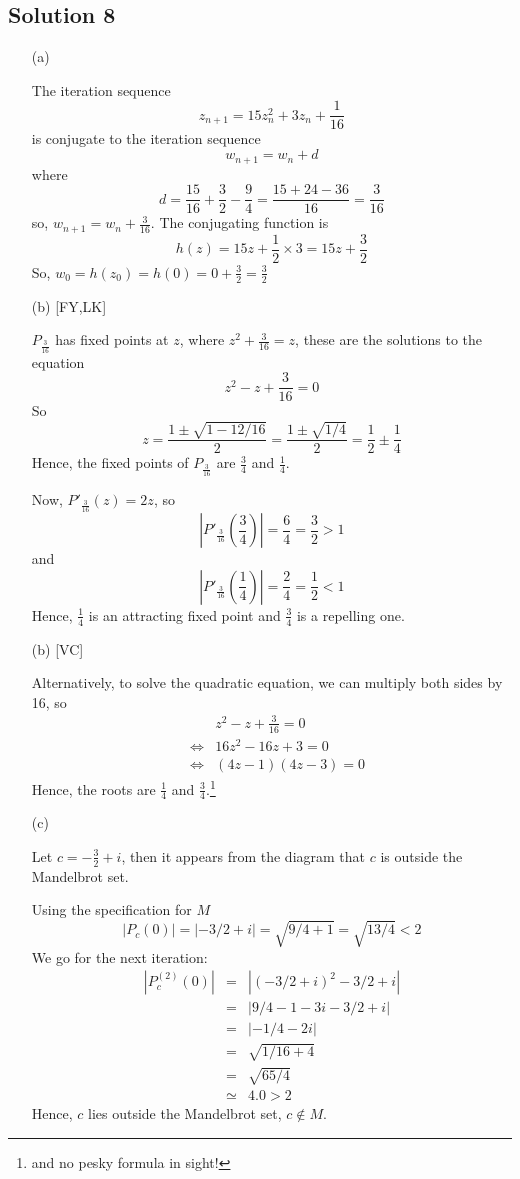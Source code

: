 \subsection*{Solution 8}

\begin{itemize}
\item[(a)]

The iteration sequence
\[
z_{n+1} = 15z_n^2 + 3z_n + \frac{1}{16}
\]
is conjugate to the iteration sequence
\[
w_{n+1} = w_n+d
\]
where
\[
d = \frac{15}{16} + \frac{3}{2} - \frac{9}{4} = \frac{15+24-36}{16} = \frac{3}{16}
\]
so, $w_{n+1} = w_n+\frac{3}{16}$.
The conjugating function is
\[
h(z) = 15z+\frac{1}{2}\times3 = 15z+\frac{3}{2}
\]
So, $w_0 = h(z_0) = h(0) = 0+\frac{3}{2} = \frac{3}{2}$

\item[(b)][FY,LK]

$P_{\frac{3}{16}}$ has fixed points at $z$, where $z^2+\frac{3}{16}=z$,
these are the solutions to the equation
\[
z^2-z+\frac{3}{16} = 0
\]
So
\[
z = \frac{ 1 \pm \sqrt{1 - 12/16} }{ 2 } = \frac{ 1 \pm \sqrt{1/4} }{ 2 } = \frac{1}{2}\pm\frac{1}{4}
\]
Hence, the fixed points of $P_{\frac{3}{16}}$ are $\frac{3}{4}$ and $\frac{1}{4}$.

Now, $P'_{\frac{3}{16}}(z) = 2z$, so
\[ \left|P'_{\frac{3}{16}}\left(\frac{3}{4}\right)\right| = \frac{6}{4} = \frac{3}{2} > 1 \]
and
\[ \left|P'_{\frac{3}{16}}\left(\frac{1}{4}\right)\right| = \frac{2}{4} = \frac{1}{2} < 1 \]
Hence, $\frac{1}{4}$ is an attracting fixed point and $\frac{3}{4}$
is a repelling one.

\item[(b)][VC]

Alternatively, to solve the quadratic equation, we can multiply both
sides by 16, so
\begin{eqnarray*}
&&
	z^2 - z + \frac{3}{16} = 0 \\
&\Leftrightarrow&
	16z^2 - 16z + 3 = 0 \\
&\Leftrightarrow&
	(4z - 1)(4z - 3) = 0
\end{eqnarray*}
Hence, the roots are $\frac{1}{4}$ and $\frac{3}{4}$.\footnote{and no
pesky formula in sight!}

\item[(c)]

Let $c=-\frac{3}{2}+i$, then it appears from the diagram that $c$ is
outside the Mandelbrot set.

Using the specification for $M$
\[
|P_c(0)| = |-3/2+i| = \sqrt{9/4+1} = \sqrt{13/4} < 2
\]
We go for the next iteration:
\begin{eqnarray*}
|P_c^{(2)}(0)|
	&=& |(-3/2+i)^2-3/2+i| \\
	&=& |9/4-1-3i-3/2+i| \\
	&=& |-1/4-2i| \\
	&=& \sqrt{1/16+4} \\
	&=& \sqrt{65/4} \\
	&\simeq& 4.0 > 2
\end{eqnarray*}
Hence, $c$ lies outside the Mandelbrot set, $c\not\in M$.

\end{itemize}

